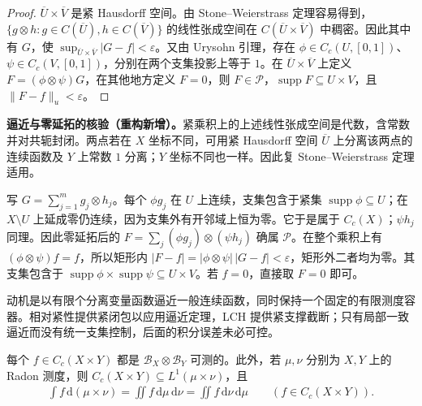 \documentclass[../../main.tex]{subfiles}
\begin{document}
\begin{proof}
$\overline U\times\overline V$ 是紧 Hausdorff 空间。由 Stone--Weierstrass 定理容易得到，$\{g\otimes h:g\in C(\overline U),h\in C(\overline V)\}$ 的线性张成空间在 $C(\overline U\times\overline V)$ 中稠密。因此其中有 $G$，使 $\sup_{\overline U\times\overline V}|G-f|<\varepsilon$。又由 Urysohn 引理，存在 $\phi\in C_c(U,[0,1])$、$\psi\in C_c(V,[0,1])$，分别在两个支集投影上等于 $1$。在 $\overline U\times\overline V$ 上定义 $F=(\phi\otimes\psi)G$，在其他地方定义 $F=0$，则 $F\in\mathcal P$，$\operatorname{supp}F\subseteq U\times V$，且 $\|F-f\|_u<\varepsilon$。
\end{proof}
\begin{remark}
\textbf{逼近与零延拓的核验（重构新增）。}紧乘积上的上述线性张成空间是代数，含常数并对共轭封闭。两点若在 $X$ 坐标不同，可用紧 Hausdorff 空间 $\overline U$ 上分离该两点的连续函数及 $Y$ 上常数 $1$ 分离；$Y$ 坐标不同也一样。因此复 Stone--Weierstrass 定理适用。

写 $G=\sum_{j=1}^mg_j\otimes h_j$。每个 $\phi g_j$ 在 $U$ 上连续，支集包含于紧集 $\operatorname{supp}\phi\subseteq U$；在 $X\setminus U$ 上延成零仍连续，因为支集外有开邻域上恒为零。它于是属于 $C_c(X)$；$\psi h_j$ 同理。因此零延拓后的 $F=\sum_j(\phi g_j)\otimes(\psi h_j)$ 确属 $\mathcal P$。在整个乘积上有 $(\phi\otimes\psi)f=f$，所以矩形内 $|F-f|=|\phi\otimes\psi|\,|G-f|<\varepsilon$，矩形外二者均为零。其支集包含于 $\operatorname{supp}\phi\times\operatorname{supp}\psi\subseteq U\times V$。若 $f=0$，直接取 $F=0$ 即可。

动机是以有限个分离变量函数逼近一般连续函数，同时保持一个固定的有限测度容器。相对紧性提供紧闭包以应用逼近定理，LCH 提供紧支撑截断；只有局部一致逼近而没有统一支集控制，后面的积分误差未必可控。
\end{remark}
\begin{proposition}\label{proposition:ch07-cc-product-integrals}
每个 $f\in C_c(X\times Y)$ 都是 $\mathscr B_X\otimes\mathscr B_Y$ 可测的。此外，若 $\mu,\nu$ 分别为 $X,Y$ 上的 Radon 测度，则 $C_c(X\times Y)\subseteq L^1(\mu\times\nu)$，且
\begin{align*}
\int f\,\mathrm d(\mu\times\nu)=\iint f\,\mathrm d\mu\,\mathrm d\nu
=\iint f\,\mathrm d\nu\,\mathrm d\mu
\qquad(f\in C_c(X\times Y)).
\end{align*}
\end{proposition}
\end{document}
